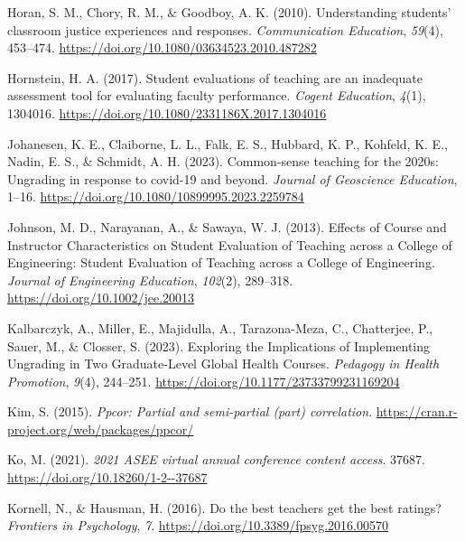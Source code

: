\documentclass[
  man]{apa7}
\newlength{\cslhangindent}
\newlength{\cslentryspacingunit} %
\newenvironment{CSLReferences}[2] %
 {%
  \setlength{\parindent}{0pt}
  \ifodd #1
  \let\oldpar\par
  \def\par{\hangindent=\cslhangindent\oldpar}
  \fi
  \setlength{\parskip}{#2\cslentryspacingunit}
 }%
 {}
\begin{document}
\begin{CSLReferences}{1}{0}
\leavevmode{}%
Horan, S. M., Chory, R. M., \& Goodboy, A. K. (2010). Understanding students' classroom justice experiences and responses. \emph{Communication Education}, \emph{59}(4), 453--474. \url{https://doi.org/10.1080/03634523.2010.487282}

\leavevmode{}%
Hornstein, H. A. (2017). Student evaluations of teaching are an inadequate assessment tool for evaluating faculty performance. \emph{Cogent Education}, \emph{4}(1), 1304016. \url{https://doi.org/10.1080/2331186X.2017.1304016}

\leavevmode{}%
Johanesen, K. E., Claiborne, L. L., Falk, E. S., Hubbard, K. P., Kohfeld, K. E., Nadin, E. S., \& Schmidt, A. H. (2023). Common-sense teaching for the 2020s: Ungrading in response to covid-19 and beyond. \emph{Journal of Geoscience Education}, 1--16. \url{https://doi.org/10.1080/10899995.2023.2259784}

\leavevmode{}%
Johnson, M. D., Narayanan, A., \& Sawaya, W. J. (2013). Effects of Course and Instructor Characteristics on Student Evaluation of Teaching across a College of Engineering: Student Evaluation of Teaching across a College of Engineering. \emph{Journal of Engineering Education}, \emph{102}(2), 289--318. \url{https://doi.org/10.1002/jee.20013}

\leavevmode{}%
Kalbarczyk, A., Miller, E., Majidulla, A., Tarazona-Meza, C., Chatterjee, P., Sauer, M., \& Closser, S. (2023). Exploring the Implications of Implementing Ungrading in Two Graduate-Level Global Health Courses. \emph{Pedagogy in Health Promotion}, \emph{9}(4), 244--251. \url{https://doi.org/10.1177/23733799231169204}

\leavevmode{}%
Kim, S. (2015). \emph{Ppcor: Partial and semi-partial (part) correlation}. \url{https://cran.r-project.org/web/packages/ppcor/}

\leavevmode{}%
Ko, M. (2021). \emph{2021 ASEE virtual annual conference content access}. 37687. \url{https://doi.org/10.18260/1-2--37687}

\leavevmode{}%
Kornell, N., \& Hausman, H. (2016). Do the best teachers get the best ratings? \emph{Frontiers in Psychology}, \emph{7}. \url{https://doi.org/10.3389/fpsyg.2016.00570}


\end{CSLReferences}
\end{document}
